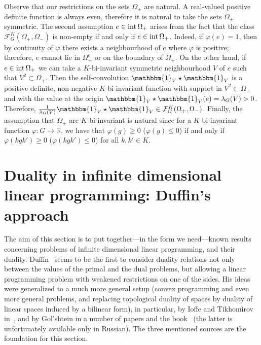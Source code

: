 \documentclass[[a4paper,english,12pt]{amsart}
\theoremstyle{plain}
\theoremstyle{remark}
\newcommand{\intt}{\mbox{\rm int\,}}
\newcommand{\ff}{\varphi}
\begin{document}
Observe that our restrictions on the sets $\Omega_\pm$ are natural. A real-valued positive definite function is always even, therefore it is natural to take the sets $\Omega_\pm$ symmetric. The second assumption $e \in \intt{\Omega_+}$ arises from the fact that the class $\mathcal{F}^K_G(\Omega_+, \Omega_-)$ is non-empty if and only if $e \in \intt{\Omega_+}$. Indeed, if $\ff(e) = 1$, then by continuity of $\ff$ there exists a neighbourhood of $e$ where $\ff$ is positive; therefore, $e$ cannot lie in $\Omega_+^c$ or on the boundary of $\Omega_+$. On the other hand, if $e \in \intt{\Omega_+}$ we can take a $K$-bi-invariant symmetric neighbourhood $V$ of \(e\) such that $V^2 \subset \Omega_+$. Then the  self-convolution $\mathbbm{1}_V \star \mathbbm{1}_V$ is a positive definite, non-negative $K$-bi-invariant function with support in $V^2  \subset \Omega_+$ and with the value at the origin $\mathbbm{1}_V \star\mathbbm{1}_V (e) = \lambda_G(V) > 0$. Therefore, $\frac{1}{\lambda_G(V)} \mathbbm{1}_V \star \mathbbm{1}_V \in \mathcal{F}^K_G(\Omega_+, \Omega_-)$. Finally, the assumption that $\Omega_{\pm}$ are $K$-bi-invariant is natural since for a $K$-bi-invariant function $\ff: G \to \mathbb{R}$, we have that $\ff(g) \ge 0$ ($\ff(g) \le 0$) if and only if $\ff(kgk') \ge 0$ ($\ff(kgk') \le 0$) for all $k,k' \in K$.



\section{Duality in infinite dimensional linear programming: Duffin's approach}\label{section:duality_Duffin}

The aim of this section is to put together---in the form we need---known results concerning problems of infinite dimensional linear programming, and their duality. Duffin~\cite{Duffin} seems to be the first to consider duality relations not only between the values of the primal and the dual problems, but allowing a linear programming problem with weakened restrictions on one of the sides.  His ideas were generalized to a much more general setup (convex programming and even more general problems, and replacing topological duality of spaces by duality of linear spaces induced by a bilinear form), in particular, by  Ioffe and Tikhomirov in~\cite{I-T}, and by Gol'shtein in a number of papers and the book~\cite{golstein} (the latter is unfortunately available only in Russian). The three mentioned sources are the foundation for this section.
\end{document}

